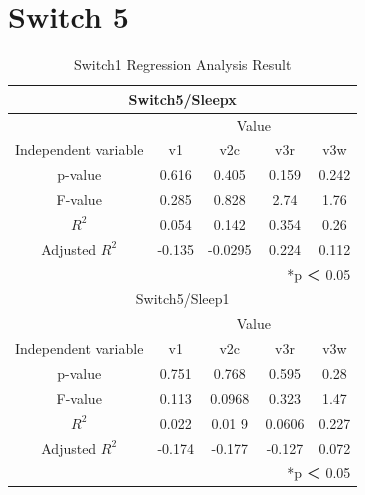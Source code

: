 \documentclass[11pt
  , a4paper
  , article
  , oneside
]{memoir}
\begin{document}
\section{Switch 5}
\begin{table}[h!]
\begin{center}
\begin{tabular}{c|c||c||c||c}
\multicolumn{5}{c}{Switch5/Sleepx}\\ \hline\hline
\multicolumn{1}{c|}{}& \multicolumn{4}{c}{Value}\\
\cline{1-5}
Independent variable & v1 & v2c & v3r & v3w      \\ \hline\hline
p-value & 0.616 & 0.405& 0.159 & 0.242\\ 
F-value & 0.285 & 0.828& 2.74 & 1.76\\ 
$  R^2  $ & 0.054 & 0.142& 0.354 & 0.26\\ 
Adjusted $  R^2  $ & -0.135 & -0.0295& 0.224 & 0.112\\ \hline\hline
\multicolumn{5}{r}{*p ＜ 0.05} \\ 
\multicolumn{5}{c}{Switch5/Sleep1}\\ \hline\hline
\multicolumn{1}{c|}{}& \multicolumn{4}{c}{Value}\\
\cline{1-5}
Independent variable & v1 & v2c & v3r & v3w      \\ \hline\hline
p-value & 0.751 & 0.768 & 0.595 & 0.28\\ 
F-value & 0.113 & 0.0968 & 0.323 & 1.47\\ 
$  R^2  $ & 0.022 & 0.01 9& 0.0606 & 0.227\\ 
Adjusted $  R^2  $ & -0.174 & -0.177 & -0.127 & 0.072\\ \hline\hline
\multicolumn{5}{r}{*p ＜ 0.05} \\ 
\end{tabular}
\caption{Switch1 Regression Analysis Result }
\end{center}
\end{table} 






\clearpage


\end{document}
